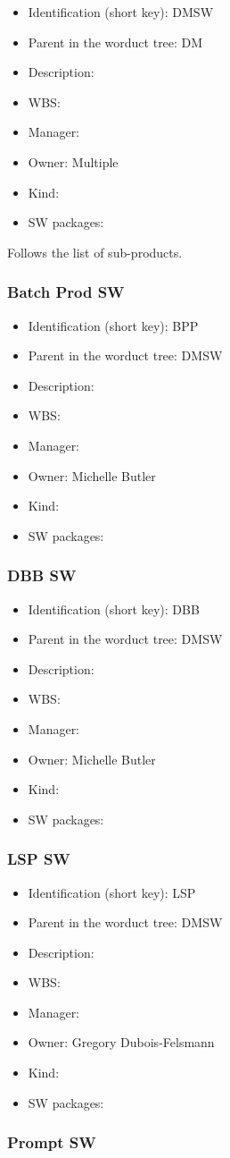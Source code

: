 \begin{itemize}\item Identification (short key): DMSW
\item Parent in the worduct tree: DM
\item Description: 
\item WBS: 
\item Manager: 
\item Owner: Multiple
\item Kind:
\item SW packages: 
\end{itemize}Follows the list of sub-products.\subsubsection{Batch Prod SW}
\begin{itemize}\item Identification (short key): BPP
\item Parent in the worduct tree: DMSW
\item Description: 
\item WBS: 
\item Manager: 
\item Owner: Michelle Butler
\item Kind:
\item SW packages: 
\end{itemize}\subsubsection{DBB SW}
\begin{itemize}\item Identification (short key): DBB
\item Parent in the worduct tree: DMSW
\item Description: 
\item WBS: 
\item Manager: 
\item Owner: Michelle Butler
\item Kind:
\item SW packages: 
\end{itemize}\subsubsection{LSP SW}
\begin{itemize}\item Identification (short key): LSP
\item Parent in the worduct tree: DMSW
\item Description: 
\item WBS: 
\item Manager: 
\item Owner: Gregory Dubois-Felsmann
\item Kind:
\item SW packages: 
\end{itemize}\subsubsection{Prompt SW}
